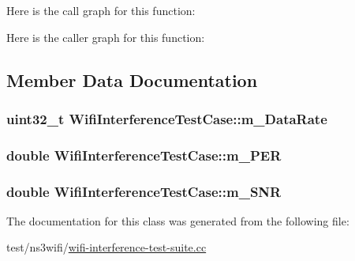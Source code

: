 Here is the call graph for this function\+:




Here is the caller graph for this function\+:




\subsection{Member Data Documentation}
\subsubsection[{\texorpdfstring{m\+\_\+\+Data\+Rate}{m_DataRate}}]{\setlength{\rightskip}{0pt plus 5cm}uint32\+\_\+t Wifi\+Interference\+Test\+Case\+::m\+\_\+\+Data\+Rate\hspace{0.3cm}{\ttfamily [private]}}\hypertarget{classWifiInterferenceTestCase_a3358f7dc0f18f41a5e9a5a2882be8078}{}\label{classWifiInterferenceTestCase_a3358f7dc0f18f41a5e9a5a2882be8078}
\subsubsection[{\texorpdfstring{m\+\_\+\+P\+ER}{m_PER}}]{\setlength{\rightskip}{0pt plus 5cm}double Wifi\+Interference\+Test\+Case\+::m\+\_\+\+P\+ER\hspace{0.3cm}{\ttfamily [private]}}\hypertarget{classWifiInterferenceTestCase_ab810c2782277c76c886528e0b9d20537}{}\label{classWifiInterferenceTestCase_ab810c2782277c76c886528e0b9d20537}
\subsubsection[{\texorpdfstring{m\+\_\+\+S\+NR}{m_SNR}}]{\setlength{\rightskip}{0pt plus 5cm}double Wifi\+Interference\+Test\+Case\+::m\+\_\+\+S\+NR\hspace{0.3cm}{\ttfamily [private]}}\hypertarget{classWifiInterferenceTestCase_aebf7a181c7f73dd03a90b12e84ecd916}{}\label{classWifiInterferenceTestCase_aebf7a181c7f73dd03a90b12e84ecd916}


The documentation for this class was generated from the following file\+:\begin{DoxyCompactItemize}
\item 
test/ns3wifi/\hyperlink{wifi-interference-test-suite_8cc}{wifi-\/interference-\/test-\/suite.\+cc}\end{DoxyCompactItemize}
